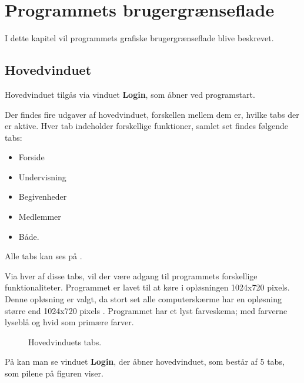 \chapter{Programmets brugergrænseflade}\label{Programmets_brugergraenseflade}

I dette kapitel vil programmets grafiske brugergrænseflade blive beskrevet.

\section{Hovedvinduet} 
Hovedvinduet tilgås via vinduet \textbf{Login}, som åbner ved programstart. 

Der findes fire udgaver af hovedvinduet, forskellen mellem dem er, hvilke tabs der er aktive.
Hver tab indeholder forskellige funktioner, samlet set findes følgende tabs:
\begin{itemize}%
    \item Forside
    \item Undervisning
    \item Begivenheder
    \item Medlemmer
    \item Både.
\end{itemize}

Alle tabs kan ses på .

Via hver af disse tabs, vil der være adgang til programmets forskellige funktionaliteter.
Programmet er lavet til at køre i opløsningen 1024x720 pixels.
Denne opløsning er valgt, da stort set alle computerskærme har en opløsning større end 1024x720 pixels \citep{resolutions}. 
Programmet har et lyst farveskema; med farverne lyseblå og hvid som primære farver.



\begin{center}
    \begin{figure}[H]
        \caption{Hovedvinduets tabs.}
        \label{img:programNavigation}
        \vspace{-40pt}
    \end{figure}
\end{center}

På  kan man se vinduet \textbf{Login}, der åbner hovedvinduet, som består af 5 tabs, som pilene på figuren viser.


